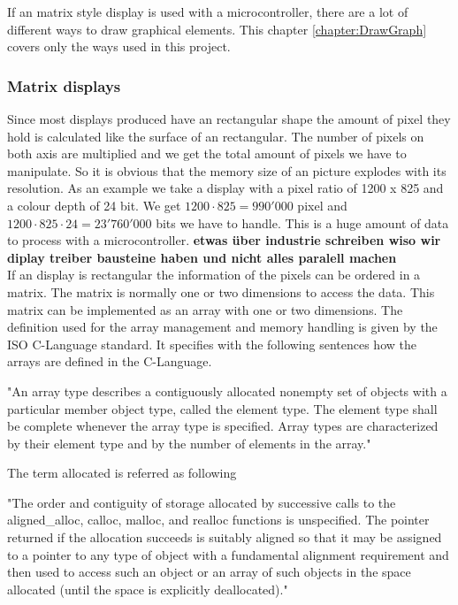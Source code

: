 
If an matrix style display is used with a microcontroller, there are a lot of different ways to draw graphical elements. This chapter \ref{chapter:DrawGraph} covers only the ways used in this project. 

\subsubsection{Matrix displays}

Since most displays produced have an rectangular shape the amount of pixel they hold is calculated like the surface of an rectangular. The number of pixels on both axis are multiplied and we get the total amount of pixels we have to manipulate. So it is obvious that the memory size of an picture explodes with its resolution. As an example we take a display with a pixel ratio of 1200 x 825 and a colour depth of 24 bit. We get $1200\cdot825=990'000$ pixel and $1200\cdot825\cdot24=23'760'000$ bits we have to handle. This is a huge amount of data to process with a microcontroller. \textbf{etwas über industrie schreiben wiso wir diplay treiber bausteine haben und nicht alles paralell machen}\\


If an display is rectangular the information of the pixels can be ordered in a matrix. The matrix is normally one or two dimensions to access the data. This matrix can be implemented as an array with one or two dimensions. The definition used for the array management and memory handling is given by the ISO C-Language standard. It specifies with the following sentences how the arrays are defined in the C-Language. 


\begin{displayquote}
	"An array type describes a contiguously allocated nonempty set of objects with a particular member object type, called the element type. The element type shall be complete whenever the array type is specified. Array types are characterized by their element type and by the number of elements in the array."
\end{displayquote}\cite{ISO/IEC9899}

The term allocated is referred as following 

\begin{displayquote}
	"The order and contiguity of storage allocated by successive calls to the aligned\_alloc, calloc, malloc, and realloc functions is unspecified. The pointer returned if the allocation succeeds is suitably aligned so that it may be assigned to a pointer to any type of object with a fundamental alignment requirement and then used to access such an object or an array of such objects in the space allocated (until the space is explicitly deallocated)."
\end{displayquote}\cite{ISO/IEC9899}

